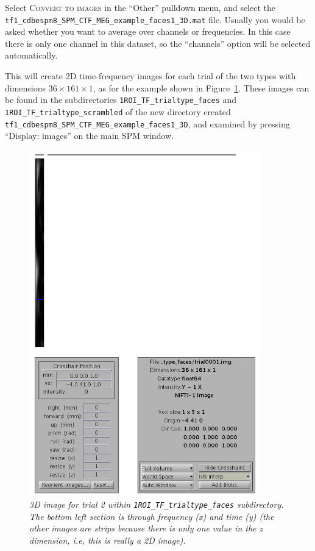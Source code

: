 Select \textsc{Convert to images} in the ``Other'' pulldown menu, and select the \texttt{tf1\_cdbespm8\_\-SPM\_\-CTF\_\-MEG\_\-example\_\-faces1\_\-3D.mat} file. Usually you would be asked whether you want to average over channels or frequencies. In this case there is only one channel in this dataset, so the ``channels'' option will be selected automatically.

This will create 2D time-frequency images for each trial of the two types with dimensions $36\times 161\times 1$, as for the example shown in Figure~\ref{multimodal:fig:15}. These images can be found in the subdirectories \texttt{1ROI\_TF\_\-trialtype\_\-faces} and \texttt{1ROI\_TF\_\-trialtype\_\-scrambled} of the new directory created \texttt{tf1\_\-cdbespm8\_\-SPM\_\-CTF\_\-MEG\_\-example\_\-faces1\_3D}, and examined by pressing ``Display: images'' on the main SPM window.

\begin{figure}
\begin{center}
\includegraphics[width=100mm]{multimodal/figures/meg_TFimage}
\caption{\em  3D image for trial 2 within \texttt{1ROI\_TF\_trialtype\_faces} subdirectory. The bottom left section is through frequency (x) and time (y) (the other images are strips because there is only one value in the z dimension, i.e, this is really a 2D image).\label{multimodal:fig:15}}
\end{center}
\end{figure}

